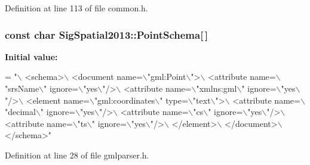 Definition at line 113 of file common.\-h.

\hypertarget{namespaceSigSpatial2013_a40970b19a17f8bf52c4dad47be296e71}{
\subsubsection[{Point\-Schema}]{\setlength{\rightskip}{0pt plus 5cm}const char Sig\-Spatial2013\-::\-Point\-Schema\mbox{[}$\,$\mbox{]}}}\label{namespaceSigSpatial2013_a40970b19a17f8bf52c4dad47be296e71}
{\bfseries Initial value\-:}
\begin{DoxyCode}
= \textcolor{stringliteral}{"\(\backslash\)}
\textcolor{stringliteral}{<schema>\(\backslash\)}
\textcolor{stringliteral}{  <document name=\(\backslash\)"gml:Point\(\backslash\)">\(\backslash\)}
\textcolor{stringliteral}{    <attribute name=\(\backslash\)"srsName\(\backslash\)" ignore=\(\backslash\)"yes\(\backslash\)"/>\(\backslash\)}
\textcolor{stringliteral}{    <attribute name=\(\backslash\)"xmlns:gml\(\backslash\)" ignore=\(\backslash\)"yes\(\backslash\)"/>\(\backslash\)}
\textcolor{stringliteral}{    <element name=\(\backslash\)"gml:coordinates\(\backslash\)" type=\(\backslash\)"text\(\backslash\)">\(\backslash\)}
\textcolor{stringliteral}{      <attribute name=\(\backslash\)"decimal\(\backslash\)" ignore=\(\backslash\)"yes\(\backslash\)"/>\(\backslash\)}
\textcolor{stringliteral}{      <attribute name=\(\backslash\)"cs\(\backslash\)" ignore=\(\backslash\)"yes\(\backslash\)"/>\(\backslash\)}
\textcolor{stringliteral}{      <attribute name=\(\backslash\)"ts\(\backslash\)" ignore=\(\backslash\)"yes\(\backslash\)"/>\(\backslash\)}
\textcolor{stringliteral}{    </element>\(\backslash\)}
\textcolor{stringliteral}{  </document>\(\backslash\)}
\textcolor{stringliteral}{</schema>"}
\end{DoxyCode}


Definition at line 28 of file gmlparser.\-h.

